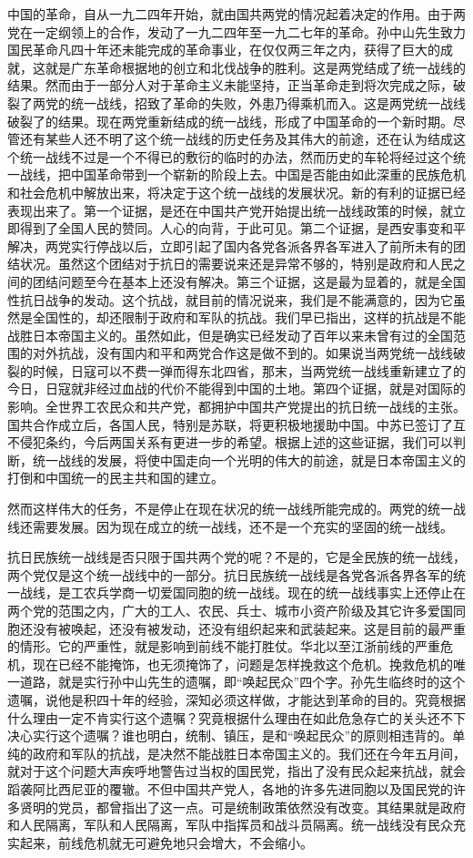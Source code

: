 中国的革命，自从一九二四年开始，就由国共两党的情况起着决定的作用。由于两党在一定纲领上的合作，发动了一九二四年至一九二七年的革命。孙中山先生致力国民革命凡四十年还未能完成的革命事业，在仅仅两三年之内，获得了巨大的成就，这就是广东革命根据地的创立和北伐战争的胜利。这是两党结成了统一战线的结果。然而由于一部分人对于革命主义未能坚持，正当革命走到将次完成之际，破裂了两党的统一战线，招致了革命的失败，外患乃得乘机而入。这是两党统一战线破裂了的结果。现在两党重新结成的统一战线，形成了中国革命的一个新时期。尽管还有某些人还不明了这个统一战线的历史任务及其伟大的前途，还在认为结成这个统一战线不过是一个不得已的敷衍的临时的办法，然而历史的车轮将经过这个统一战线，把中国革命带到一个崭新的阶段上去。中国是否能由如此深重的民族危机和社会危机中解放出来，将决定于这个统一战线的发展状况。新的有利的证据已经表现出来了。第一个证据，是还在中国共产党开始提出统一战线政策的时候，就立即得到了全国人民的赞同。人心的向背，于此可见。第二个证据，是西安事变和平解决，两党实行停战以后，立即引起了国内各党各派各界各军进入了前所未有的团结状况。虽然这个团结对于抗日的需要说来还是异常不够的，特别是政府和人民之间的团结问题至今在基本上还没有解决。第三个证据，这是最为显着的，就是全国性抗日战争的发动。这个抗战，就目前的情况说来，我们是不能满意的，因为它虽然是全国性的，却还限制于政府和军队的抗战。我们早已指出，这样的抗战是不能战胜日本帝国主义的。虽然如此，但是确实已经发动了百年以来未曾有过的全国范围的对外抗战，没有国内和平和两党合作这是做不到的。如果说当两党统一战线破裂的时候，日寇可以不费一弹而得东北四省，那末，当两党统一战线重新建立了的今日，日寇就非经过血战的代价不能得到中国的土地。第四个证据，就是对国际的影响。全世界工农民众和共产党，都拥护中国共产党提出的抗日统一战线的主张。国共合作成立后，各国人民，特别是苏联，将更积极地援助中国。中苏已签订了互不侵犯条约，今后两国关系有更进一步的希望。根据上述的这些证据，我们可以判断，统一战线的发展，将使中国走向一个光明的伟大的前途，就是日本帝国主义的打倒和中国统一的民主共和国的建立。

然而这样伟大的任务，不是停止在现在状况的统一战线所能完成的。两党的统一战线还需要发展。因为现在成立的统一战线，还不是一个充实的坚固的统一战线。

抗日民族统一战线是否只限于国共两个党的呢？不是的，它是全民族的统一战线，两个党仅是这个统一战线中的一部分。抗日民族统一战线是各党各派各界各军的统一战线，是工农兵学商一切爱国同胞的统一战线。现在的统一战线事实上还停止在两个党的范围之内，广大的工人、农民、兵士、城市小资产阶级及其它许多爱国同胞还没有被唤起，还没有被发动，还没有组织起来和武装起来。这是目前的最严重的情形。它的严重性，就是影响到前线不能打胜仗。华北以至江浙前线的严重危机，现在已经不能掩饰，也无须掩饰了，问题是怎样挽救这个危机。挽救危机的唯一道路，就是实行孙中山先生的遗嘱，即“唤起民众”四个字。孙先生临终时的这个遗嘱，说他是积四十年的经验，深知必须这样做，才能达到革命的目的。究竟根据什么理由一定不肯实行这个遗嘱？究竟根据什么理由在如此危急存亡的关头还不下决心实行这个遗嘱？谁也明白，统制、镇压，是和“唤起民众”的原则相违背的。单纯的政府和军队的抗战，是决然不能战胜日本帝国主义的。我们还在今年五月间，就对于这个问题大声疾呼地警告过当权的国民党，指出了没有民众起来抗战，就会蹈袭阿比西尼亚的覆辙。不但中国共产党人，各地的许多先进同胞以及国民党的许多贤明的党员，都曾指出了这一点。可是统制政策依然没有改变。其结果就是政府和人民隔离，军队和人民隔离，军队中指挥员和战斗员隔离。统一战线没有民众充实起来，前线危机就无可避免地只会增大，不会缩小。

